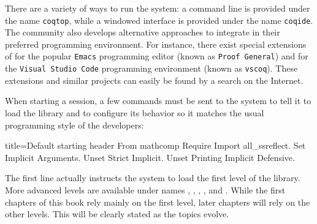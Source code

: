 
There are a variety of ways to run the \Coq{} system: a command line is
provided under the name \texttt{coqtop}, while a windowed interface is
provided under the name \texttt{coqide}.  The \Coq{} community also develops
alternative approaches to integrate \Coq{} in their preferred programming
environment.  For instance, there exist special extensions of \Coq{} for the
popular \texttt{Emacs} programming editor (known as \texttt{Proof General})
and for the \texttt{Visual Studio Code} programming environment
(known as \texttt{vscoq}).  These extensions and similar projects can easily
be found by a search on the Internet.

When starting a \Coq{} session, a few commands must be sent to the \Coq{}
system to tell it to load the \mcbMC{} library and to configure its behavior
so it matches the usual programming style of the \mcbMC{} developers:

\begin{coq}{}{title={Default starting header}}
From mathcomp Require Import all_ssreflect.
Set Implicit Arguments.
Unset Strict Implicit.
Unset Printing Implicit Defensive.
\end{coq}
The first line actually instructs the \Coq{} system to load the first level
of the \mcbMC{} library.  More advanced levels are available under names
, , , ,
and .  While the first chapters of this book
rely mainly on the first
level, later chapters will rely on the other levels.  This will be clearly
stated as the topics evolve.
